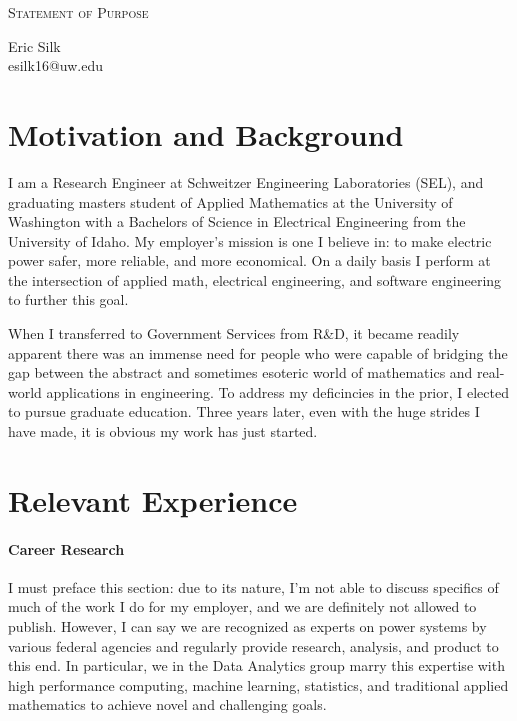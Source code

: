 \documentclass[letterpaper]{article}
\makeatletter
\newcommand{\soptitle}{Statement of Purpose}
\newcommand{\yourname}{Eric Silk}
\newcommand{\youremail}{esilk16@uw.edu}
\makeatother
\begin{document}
\begin{center}{\huge \scshape \soptitle}\end{center}
\begin{center}\vspace{0.2em} {\Large \yourname\\}
  {\youremail}\end{center}

\section*{Motivation and Background}
I am a Research Engineer at Schweitzer Engineering Laboratories (SEL), and graduating masters
student of Applied Mathematics at the University of Washington with a Bachelors of Science
in Electrical Engineering from the University of Idaho. My employer's mission is
one I believe in: to make electric power safer, more reliable, and more economical. On a daily
basis I perform at the intersection of applied math, electrical engineering, and software
engineering to further this goal.

When I transferred to Government Services from R\&D, it became readily apparent there was
an immense need for people who were capable of bridging the gap between the abstract and
sometimes esoteric world of mathematics and real-world applications in engineering.
To address my deficincies in the prior, I elected to pursue graduate education. 
Three years later, even with the huge strides I have made, it is obvious my work has
just started.

\section*{Relevant Experience}
\paragraph{Career Research}
I must preface this section: due to its nature, I'm not able to discuss specifics of
much of the work I do for my employer, and we are definitely not allowed to publish.
However, I can say we are recognized as experts
on power systems by various federal agencies and regularly provide research, analysis,
and product to this end. In particular, we in the Data Analytics group marry this expertise
with high performance computing, machine learning, statistics, and traditional applied
mathematics to achieve novel and challenging goals.
\end{document}
